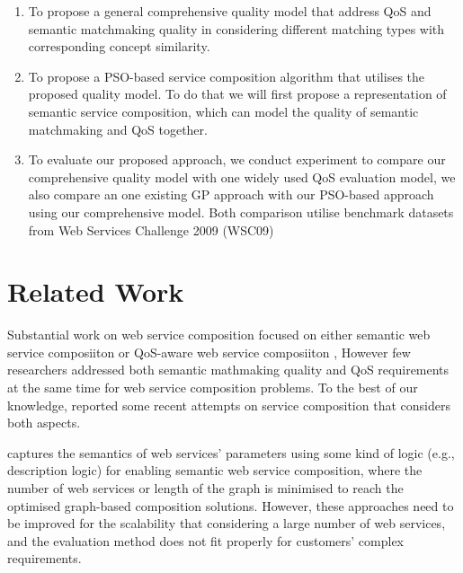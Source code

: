 \documentclass{IEEEtran}
\begin{document}
\begin{enumerate}
 \item To propose a general comprehensive quality model that address QoS and semantic matchmaking quality in considering different matching types with corresponding concept similarity.
  
 \item To propose a PSO-based service composition algorithm that utilises the proposed quality model. To do that we will first propose a representation of semantic service composition, which can model the quality of semantic matchmaking and QoS together.
  
 \item To evaluate our proposed approach, we conduct experiment to compare our comprehensive quality model with one widely used QoS evaluation model, we also compare an one existing GP approach with our PSO-based approach using our comprehensive model. Both comparison utilise benchmark datasets from Web Services Challenge 2009 (WSC09) \cite{kona2009wsc} 
  
\end{enumerate}

\section{Related Work} \label{relatedWork}
Substantial work on web service composition focused on either semantic web service composiiton \cite{boustil2014semantic,mier2015integrated, bansal2016generalized} or QoS-aware web service composiiton \cite{da2016particle,da2015graphevol,yu2013adaptive, gupta2015optimization,qi2010combining,ma2015hybrid}, However few researchers addressed both semantic mathmaking quality and QoS requirements at the same time for web service composition problems. To the best of our knowledge, \cite{lecue2009optimizing,fanjiang2014semantic,pop2009immune} reported some recent attempts on service composition that considers both aspects.

\cite{boustil2014semantic,mier2015integrated, bansal2016generalized} captures the semantics of web services' parameters using some kind of logic (e.g., description logic) for enabling semantic web service composition, where the number of web services or length of the graph is minimised to reach the optimised graph-based composition solutions. However, these approaches need to be improved for the scalability that considering a large number of web services, and the evaluation method does not fit properly for customers' complex requirements.
\end{document}
